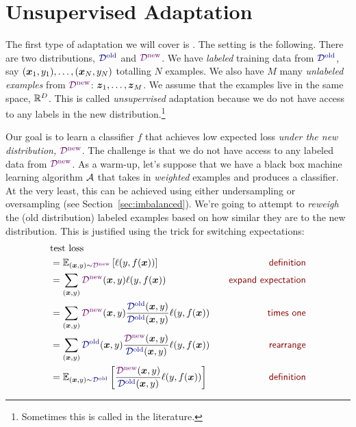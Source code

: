\section{Unsupervised Adaptation}

\newcommand{\Dold}{\textcolor{darkblue}{\cD^{\text{old}}}}
\newcommand{\Dnew}{\textcolor{darkpurple}{\cD^{\text{new}}}}
\newcommand{\Dbase}{\textcolor{darkergreen}{\cD^{\text{base}}}}

The first type of adaptation we will cover is . The setting is the following. There are two distributions, $\Dold$ and $\Dnew$. We have \emph{labeled} training data from $\Dold$, say $({\boldsymbol{x}}_1, y_1), \dots, ({\boldsymbol{x}}_N, y_N)$ totalling $N$ examples. We also have $M$ many \emph{unlabeled examples} from $\Dnew$: ${\boldsymbol{z}}_1, \dots, {\boldsymbol{z}}_M$. We assume that the examples live in the same space, $\mathbb{R}^D$. This is called \emph{unsupervised} adaptation because we do not have access to any labels in the new distribution.\footnote{Sometimes this is called  in the literature.}

Our goal is to learn a classifier $f$ that achieves low expected loss \emph{under the new distribution, $\Dnew$}.
The challenge is that we do not have access to any labeled data from $\Dnew$.
As a warm-up, let's suppose that we have a black box machine learning algorithm $\mathcal{A}$ that takes in \emph{weighted} examples and produces a classifier.
At the very least, this can be achieved using either undersampling or oversampling (see Section~\ref{sec:imbalanced}).
We're going to attempt to \emph{reweigh} the (old distribution) labeled examples based on how similar they are to the new distribution.
This is justified using the  trick for switching expectations:
~
\begin{align}
&\text{test loss} \\
&= \Ep_{(\vx,y) \sim \Dnew}\left[ \ell(y, f(\vx)) \right] \becauseof{definition} \\
&= \sum_{(\vx,y)} \Dnew(\vx,y) \ell(y, f(\vx)) \becauseof{expand expectation} \\
&= \sum_{(\vx,y)} \Dnew(\vx,y) \frac {\Dold(\vx,y)} {\Dold(\vx,y)} \ell(y, f(\vx)) \becauseof{times one} \\
&= \sum_{(\vx,y)} \Dold(\vx,y) \frac {\Dnew(\vx,y)} {\Dold(\vx,y)} \ell(y, f(\vx)) \becauseof{rearrange} \\
&= \Ep_{(\vx,y) \sim \Dold}\left[ \frac {\Dnew(\vx,y)} {\Dold(\vx,y)} \ell(y, f(\vx)) \right] \becauseof{definition}
\end{align}

